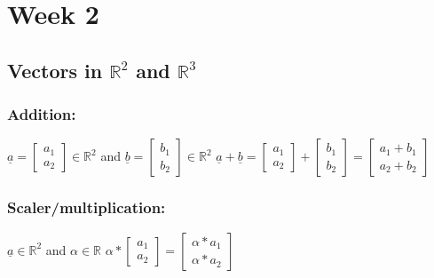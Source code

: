 \section{Week 2}
\subsection{Vectors in $\mathbb{R}^2$ and $\mathbb{R}^3$}

\subsubsection{Addition:}
$\underline{a} = \begin{bmatrix} a_1 \\ a_2 \end{bmatrix} \in \mathbb{R}^2$ and $\underline{b} = \begin{bmatrix} b_1 \\ b_2 \end{bmatrix} \in \mathbb{R}^2 $
\newline
$\underline{a} + \underline{b} = \begin{bmatrix} a_1 \\ a_2 \end{bmatrix} + \begin{bmatrix} b_1 \\ b_2 \end{bmatrix} = \begin{bmatrix} a_1 + b_1 \\ a_2 + b_2 \end{bmatrix}$

\subsubsection{Scaler/multiplication:} 
$\underline{a} \in \mathbb{R}^2$ and $\alpha \in \mathbb{R}$
\newline
$\alpha * \begin{bmatrix} a_1 \\ a_2 \end{bmatrix} = \begin{bmatrix} \alpha * a_1 \\ \alpha * a_2 \end{bmatrix}$

